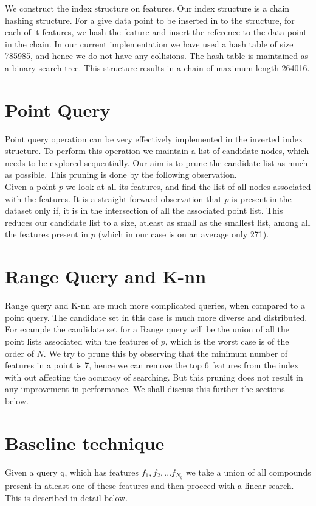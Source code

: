 
We construct the index structure on features. Our index structure is a chain hashing structure. For a give data point to be inserted in to the structure, for each of it features, we hash the feature and insert the reference to the data point in the chain. In our current implementation we have used a hash table of size 785985, and hence we do not have any collisions. The hash table is maintained as a binary search tree. This structure results in a chain of maximum length 264016.\\

\section{Point Query}

Point query operation can be very effectively 
implemented in the inverted index structure. To perform this operation we maintain a list of candidate nodes, which needs to be explored sequentially. Our aim is to prune the candidate list as much as possible. This pruning is done by the following observation.\\
Given a point $p$ we look at all its features, and find the list of all nodes associated with the features. It is a straight forward observation that $p$ is present in the dataset only if, it is in the intersection of all the associated point list. This reduces our candidate list to a size, atleast as small as the smallest list, among all the features present in $p$ (which in our case is on an average only 271).\\

\section{Range Query and K-nn}
Range query and K-nn are much more complicated queries, when compared to a point query. The candidate set in this case is much more diverse and distributed. For example the candidate set for a Range query will be the union of all the point lists associated with the features of $p$, which is the worst case is of the order of $N$. We try to prune this by observing that the minimum number of features in a point is 7, hence we can remove the top 6 features from the index with out affecting the accuracy of searching. But this pruning does not result in any improvement in performance. We shall discuss this further the sections below.\\

\section{Baseline technique}
 Given a query q, which has features $f_1, f_2,...f_{N_q}$ we take a union of all compounds present in atleast one of these features and then proceed with a linear search. This is described in detail below.

